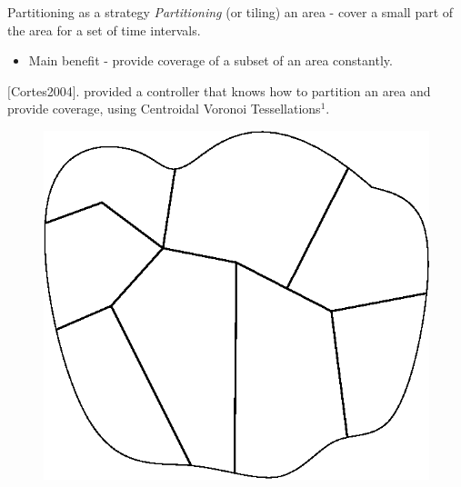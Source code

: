 \documentclass[t]{beamer}
\begin{document}
\begin{frame}[label=motivation12]{Partitioning as a strategy}
\emph{Partitioning} (or tiling) an area - cover a small part of the area for a set of time intervals.
\begin{itemize}
\item Main benefit - provide coverage of a subset of an area constantly.
\end{itemize}

$[$Cortes2004$]$. provided a controller that knows how to partition an area and provide coverage, using Centroidal Voronoi Tessellations$^1$.

\begin{figure}[b]
\includegraphics[scale=0.4]{motivation/partitioning.eps}
\end{figure}

\end{frame}

\end{document}
